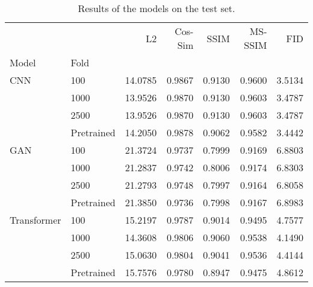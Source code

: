 \begin{table}
\centering
\caption{Results of the models on the test set.}
\label{tab:results}
\begin{tabular}{llrrrrr}
\toprule
            &            &      L2 &  Cos-Sim &   SSIM &  MS-SSIM &    FID \\
Model & Fold &         &          &        &          &        \\
\midrule
CNN & 100 & 14.0785 &   0.9867 & 0.9130 &   0.9600 & 3.5134 \\
            & 1000 & 13.9526 &   0.9870 & 0.9130 &   0.9603 & 3.4787 \\
            & 2500 & 13.9526 &   0.9870 & 0.9130 &   0.9603 & 3.4787 \\
            & Pretrained & 14.2050 &   0.9878 & 0.9062 &   0.9582 & 3.4442 \\
GAN & 100 & 21.3724 &   0.9737 & 0.7999 &   0.9169 & 6.8803 \\
            & 1000 & 21.2837 &   0.9742 & 0.8006 &   0.9174 & 6.8303 \\
            & 2500 & 21.2793 &   0.9748 & 0.7997 &   0.9164 & 6.8058 \\
            & Pretrained & 21.3850 &   0.9736 & 0.7998 &   0.9167 & 6.8983 \\
Transformer & 100 & 15.2197 &   0.9787 & 0.9014 &   0.9495 & 4.7577 \\
            & 1000 & 14.3608 &   0.9806 & 0.9060 &   0.9538 & 4.1490 \\
            & 2500 & 15.0630 &   0.9804 & 0.9041 &   0.9536 & 4.4144 \\
            & Pretrained & 15.7576 &   0.9780 & 0.8947 &   0.9475 & 4.8612 \\
\bottomrule
\end{tabular}
\end{table}
